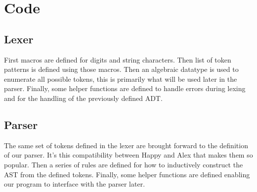 \documentclass[12pt,a4paper]{report}
\theoremstyle{definition}
\theoremstyle{remark}
\begin{document}


\chapter{Code}

\section{Lexer}\label{appendix: lexer}
First macros are defined for digits and string characters. Then list of token patterns is defined using those macros. Then an algebraic datatype is used to enumerate all possible tokens, this is primarily what will be used later in the parser. Finally, some helper functions are defined to handle errors during lexing and for the handling of the previously defined ADT.



\section{Parser}\label{appendix: parser}
The same set of tokens defined in the lexer are brought forward to the definition of our parser. It's this compatibility between Happy and Alex that makes them so popular. Then a series of rules are defined for how to inductively construct the AST from the defined tokens. Finally, some helper functions are defined enabling our program to interface with the parser later. 



\end{document}
